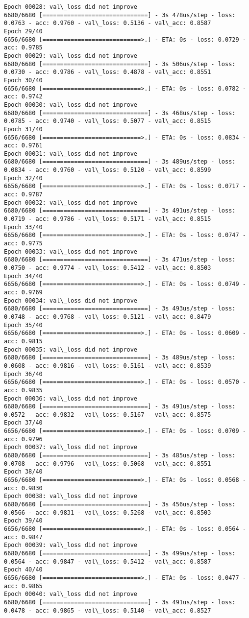 \documentclass[11pt]{article}
\begin{document}
\begin{Verbatim}[commandchars=\\\{\}]
Epoch 00028: val\_loss did not improve
6680/6680 [==============================] - 3s 478us/step - loss: 0.0763 - acc: 0.9760 - val\_loss: 0.5136 - val\_acc: 0.8587
Epoch 29/40
6656/6680 [============================>.] - ETA: 0s - loss: 0.0729 - acc: 0.9785
Epoch 00029: val\_loss did not improve
6680/6680 [==============================] - 3s 506us/step - loss: 0.0730 - acc: 0.9786 - val\_loss: 0.4878 - val\_acc: 0.8551
Epoch 30/40
6656/6680 [============================>.] - ETA: 0s - loss: 0.0782 - acc: 0.9742
Epoch 00030: val\_loss did not improve
6680/6680 [==============================] - 3s 468us/step - loss: 0.0785 - acc: 0.9740 - val\_loss: 0.5077 - val\_acc: 0.8515
Epoch 31/40
6656/6680 [============================>.] - ETA: 0s - loss: 0.0834 - acc: 0.9761
Epoch 00031: val\_loss did not improve
6680/6680 [==============================] - 3s 489us/step - loss: 0.0834 - acc: 0.9760 - val\_loss: 0.5120 - val\_acc: 0.8599
Epoch 32/40
6656/6680 [============================>.] - ETA: 0s - loss: 0.0717 - acc: 0.9787
Epoch 00032: val\_loss did not improve
6680/6680 [==============================] - 3s 491us/step - loss: 0.0719 - acc: 0.9786 - val\_loss: 0.5171 - val\_acc: 0.8515
Epoch 33/40
6656/6680 [============================>.] - ETA: 0s - loss: 0.0747 - acc: 0.9775
Epoch 00033: val\_loss did not improve
6680/6680 [==============================] - 3s 471us/step - loss: 0.0750 - acc: 0.9774 - val\_loss: 0.5412 - val\_acc: 0.8503
Epoch 34/40
6656/6680 [============================>.] - ETA: 0s - loss: 0.0749 - acc: 0.9769
Epoch 00034: val\_loss did not improve
6680/6680 [==============================] - 3s 493us/step - loss: 0.0748 - acc: 0.9768 - val\_loss: 0.5121 - val\_acc: 0.8479
Epoch 35/40
6656/6680 [============================>.] - ETA: 0s - loss: 0.0609 - acc: 0.9815
Epoch 00035: val\_loss did not improve
6680/6680 [==============================] - 3s 489us/step - loss: 0.0608 - acc: 0.9816 - val\_loss: 0.5161 - val\_acc: 0.8539
Epoch 36/40
6656/6680 [============================>.] - ETA: 0s - loss: 0.0570 - acc: 0.9835
Epoch 00036: val\_loss did not improve
6680/6680 [==============================] - 3s 491us/step - loss: 0.0572 - acc: 0.9832 - val\_loss: 0.5167 - val\_acc: 0.8575
Epoch 37/40
6656/6680 [============================>.] - ETA: 0s - loss: 0.0709 - acc: 0.9796
Epoch 00037: val\_loss did not improve
6680/6680 [==============================] - 3s 485us/step - loss: 0.0708 - acc: 0.9796 - val\_loss: 0.5068 - val\_acc: 0.8551
Epoch 38/40
6656/6680 [============================>.] - ETA: 0s - loss: 0.0568 - acc: 0.9830
Epoch 00038: val\_loss did not improve
6680/6680 [==============================] - 3s 456us/step - loss: 0.0566 - acc: 0.9831 - val\_loss: 0.5268 - val\_acc: 0.8503
Epoch 39/40
6656/6680 [============================>.] - ETA: 0s - loss: 0.0564 - acc: 0.9847
Epoch 00039: val\_loss did not improve
6680/6680 [==============================] - 3s 499us/step - loss: 0.0564 - acc: 0.9847 - val\_loss: 0.5412 - val\_acc: 0.8587
Epoch 40/40
6656/6680 [============================>.] - ETA: 0s - loss: 0.0477 - acc: 0.9865
Epoch 00040: val\_loss did not improve
6680/6680 [==============================] - 3s 491us/step - loss: 0.0478 - acc: 0.9865 - val\_loss: 0.5140 - val\_acc: 0.8527


\end{Verbatim}
\end{document}
